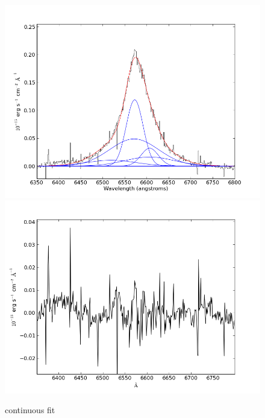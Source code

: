 \documentclass[usenatbib]{mn2e}
\begin{document}
\newpage


\begin{figure}
\begin{center}
\includegraphics[width=0.46\linewidth,angle=0]{Halpha_16.png}\\
\vspace{5mm}
\includegraphics[width=0.49\linewidth,angle=0]{Halpha_res_16.png}\\
\end{center} 
\caption{continuous fit \label{fig:landscape}}   
\end{figure}

\newpage
\end{document}
